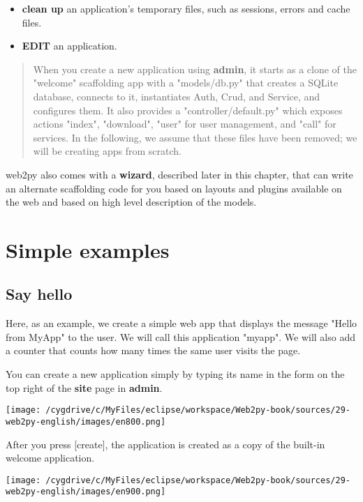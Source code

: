 \documentclass[justified,sixbynine,notoc]{tufte-book}
\def\inxx#1{\index{#1}}
\begin{document}
\begin{fullwidth}
\begin{itemize}
\item {\bf clean up} an application's temporary files, such as sessions, errors and cache files.

\item {\bf EDIT} an application.
\end{itemize}

\begin{quote}When you create a new application using {\bf admin}, it starts as a clone of the "welcome" scaffolding app with a "models/db.py" that creates a SQLite database, connects to it, instantiates Auth, Crud, and Service, and configures them. It also provides a "controller/default.py" which exposes actions "index", "download", "user" for user management, and "call" for services. In the following, we assume that these files have been removed; we will be creating apps from scratch.\end{quote}
web2py also comes with a {\bf wizard}, described later in this chapter, that can write an alternate scaffolding code for you based on layouts and plugins available on the web and based on high level description of the models.

\goodbreak\section{Simple examples}

\goodbreak\subsection{Say hello}

\inxx{index}

Here, as an example, we create a simple web app that displays the message "Hello from MyApp" to the user. We will call this application "myapp". We will also add a counter that counts how many times the same user visits the page.

You can create a new application simply by typing its name in the form on the top right of the {\bf site} page in {\bf admin}.


\goodbreak\begin{center}\texttt{[image: /cygdrive/c/MyFiles/eclipse/workspace/Web2py-book/sources/29-web2py-english/images/en800.png]}\end{center}


After you press [create], the application is created as a copy of the built-in welcome application.


\goodbreak\begin{center}\texttt{[image: /cygdrive/c/MyFiles/eclipse/workspace/Web2py-book/sources/29-web2py-english/images/en900.png]}\end{center}



\end{fullwidth}
\end{document}
